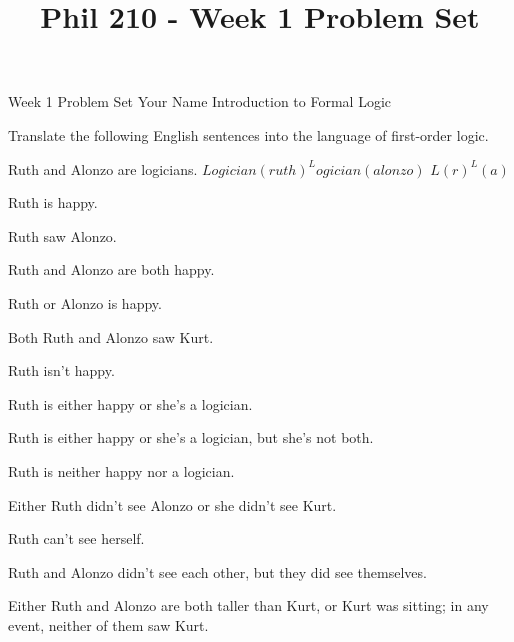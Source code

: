 
\title{Phil 210 - Week 1 Problem Set}

\heading
Week 1 Problem Set
Your Name
Introduction to Formal Logic
\endheading

Translate the following English sentences into the language of first-order logic.

\problems
{}
Ruth and Alonzo are logicians.
	\answer
	$ Logician(ruth) ^ Logician(alonzo) $ \OR $L(r)^L(a)$
	\endanswer

Ruth is happy.
	\answer
	$ $
	\endanswer

Ruth saw Alonzo.
	\answer
	$ $
	\endanswer

Ruth and Alonzo are both happy.
	\answer
	$ $
	\endanswer

Ruth or Alonzo is happy.
	\answer
	$ $
	\endanswer

Both Ruth and Alonzo saw Kurt.
	\answer
	$ $
	\endanswer

Ruth isn't happy.
	\answer
	$ $
	\endanswer

Ruth is either happy or she's a logician.
	\answer
	$ $
	\endanswer

Ruth is either happy or she's a logician, but she's not both.
	\answer
	$ $
	\endanswer

Ruth is neither happy nor a logician.
	\answer
	$ $
	\endanswer

Either Ruth didn't see Alonzo or she didn't see Kurt.
	\answer
	$ $
	\endanswer

Ruth can't see herself.
	\answer
	$ $
	\endanswer

Ruth and Alonzo didn't see each other, but they did see themselves.
	\answer
	$ $
	\endanswer

Either Ruth and Alonzo are both taller than Kurt, or Kurt was sitting; in any event, neither of them saw Kurt.
	\answer
	$ $
	\endanswer

\endproblems
\bye
